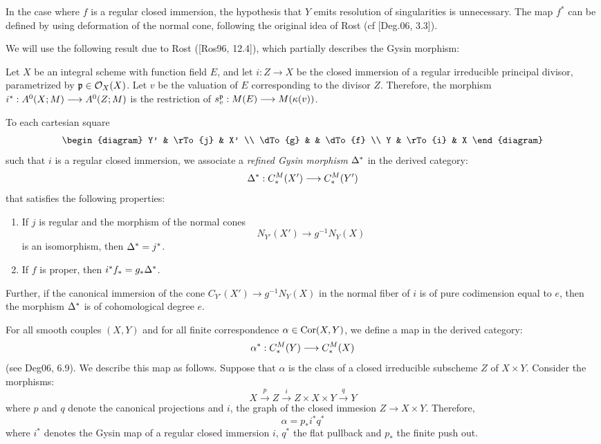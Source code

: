 In the case where $f$ is a regular closed immersion, the 
hypothesis that $Y$ emits resolution of singularities is 
unnecessary. The map $f^*$ can be defined by using deformation
of the normal cone, following the original idea of Rost (cf 
[Deg.06, 3.3]).

We will use the following result due to Rost ([Ros96, 12.4]),
which partially describes the Gysin morphism:

\begin{prop}
Let $X$ be an integral scheme with function field $E$, and let $i: 
Z \to X$ be the closed immersion of a regular irreducible 
principal divisor, parametrized by $\mathfrak{p} \in \mathcal{O}_X(X)$. Let 
$v$ be the valuation of $E$ corresponding to the divisor $Z$. 
Therefore, the morphism $i^*: A^0(X; M) \longrightarrow A^0(Z; 
M)$ is the restriction of $s_{v}^{\mathfrak{p}}: M(E) \longrightarrow 
M(\kappa(v))$.
\end{prop}

To each cartesian square
\[
\begin{diagram}
Y'      & \rTo{j} & X'      \\
\dTo{g} &         & \dTo{f} \\
Y       & \rTo{i} & X
\end{diagram}
\]
such that $i$ is a regular closed immersion, we associate a 
\emph{refined Gysin morphism} $\Delta^*$ in the derived 
category:
\[
\Delta^*: C_*^{M}(X') \longrightarrow C_*^{M}(Y')
\]
that satisfies the following properties:
\begin{enumerate}
\item If $j$ is regular and the morphism of the normal cones
\[
N_{Y'}(X') \to g^{-1}N_Y(X)
\] 
is an isomorphism, then $\Delta^* = j^*$.

\item If $f$ is proper, then $i^*f_* = g_*\Delta^*$.
\end{enumerate}

Further, if the canonical immersion of the cone $C_{Y'}(X') \to
g^{-1}N_Y(X)$ in the normal fiber of $i$ is of pure codimension
equal to $e$, then the morphism $\Delta^*$ is of cohomological
degree $e$.

For all smooth couples $(X, Y)$ and for all finite correspondence
$\alpha \in \mathrm{Cor}(X, Y)$, we define a map in the derived category:
\[
\alpha^* : C_*^{M}(Y) \longrightarrow C_*^{M}(X)
\]
(see Deg06, 6.9). We describe this map as follows. Suppose that 
$\alpha$ is the class of a closed irreducible subscheme $Z$ of $X 
\times Y$. Consider the morphisms:
\[
X \stackrel{p}{\rightarrow} Z \stackrel{i}{\to} Z \times X \times Y
\stackrel{q}{\to} Y
\]
where $p$ and $q$ denote the canonical projections and $i$, the
graph of the closed immesion $Z \to X \times Y$. Therefore,
\begin{equation}
\alpha = p_* i^*q^*
\end{equation}
where $i^*$ denotes the Gysin map of a regular closed immersion 
$i$, $q^*$ the flat pullback and $p_*$ the finite push out.

